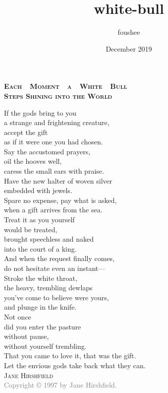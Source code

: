 \documentclass[12pt]{memoir}
\title{white-bull}
\author{foushee }
\date{December 2019}
\begin{document}
\thispagestyle{empty}
\noindent \textbf{\large \textsc{Each~~Moment~~a~~White~~Bull\\ Steps Shining into the World}}
\vspace{32pt}

\noindent If the gods bring to you\\
a strange and frightening creature,\\
accept the gift\\
as if it were one you had chosen.\\

\noindent Say the accustomed prayers,\\
oil the hooves well,\\
caress the small ears with praise.\\

\noindent Have the new halter of woven silver\\
embedded with jewels.\\
Spare no expense, pay what is asked,\\
when a gift arrives from the sea.\\

\noindent Treat it as you yourself\\
would be treated,\\
brought speechless and naked\\
into the court of a king.\\

\noindent And when the request finally comes,\\
do not hesitate even an instant---\\

\noindent Stroke the white throat,\\
the heavy, trembling dewlaps\\
you've come to believe were yours,\\
and plunge in the knife.\\

\noindent Not once\\
did you enter the pasture\\
without pause,\\
without yourself trembling.\\
That you came to love it, that was the gift.\\

\noindent Let the envious gods take back what they can.\\

\vspace{30pt}
\hspace{103pt} \textsc{Jane Hirshfield}\\
\vfill
\noindent\textcolor{gray}{\footnotesize Copyright © 1997 by Jane Hirshfield.}
\end{document}
